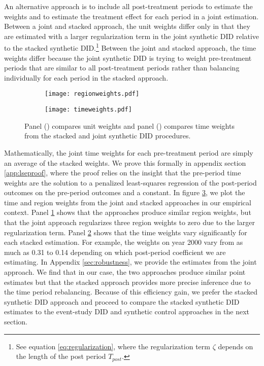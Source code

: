 \documentclass[12pt]{article}
\begin{document}
An alternative approach is to include all post-treatment periods to estimate the weights and to estimate the treatment effect for each period in a joint estimation.  Between a joint and stacked approach, the unit weights differ only in that they are estimated with a larger regularization term in the joint synthetic DID relative to the stacked synthetic DID.\footnote{See equation \ref{eq:regularization}, where the regularization term \(\zeta\) depends on the length of the post period \(T_{post}\).}  Between the joint and stacked approach, the time weights differ because the joint synthetic DID is trying to weight pre-treatment periods that are similar to all post-treatment periods rather than balancing individually for each period in the stacked approach.  

\begin{figure}
\centering
\begin{subfigure}[t]{.49\textwidth}
    \centering
    \vspace{0pt}
     \texttt{[image: regionweights.pdf]}
        \caption{}\label{fig:regionweights}
\end{subfigure}
    \begin{subfigure}[t]{.49\textwidth}
    \centering
    \vspace{0pt}
     \texttt{[image: timeweights.pdf]}
        \caption{}\label{fig:timeweights}
\end{subfigure}
    \caption{Panel () compares unit weights and panel () compares time weights from the stacked and joint synthetic DID procedures.} \label{fig:stackedjointcomparison}
\end{figure}

Mathematically, the joint time weights for each pre-treatment period are simply an average of the stacked weights.  We prove this formally in appendix section \ref{app:lseproof}, where the proof relies on the insight that the pre-period time weights are the solution to a penalized least-squares regression of the post-period outcomes on the pre-period outcomes and a constant.  In figure \ref{fig:stackedjointcomparison}, we plot the time and region weights from the joint and stacked approaches in our empirical context.  Panel \ref{fig:regionweights} shows that the approaches produce similar region weights, but that the joint approach regularizes three region weights to zero due to the larger regularization term.  Panel \ref{fig:timeweights} shows that the time weights vary significantly for each stacked estimation.  For example, the weights on year 2000 vary from as much as 0.31 to 0.14 depending on which post-period coefficient we are estimating.  In Appendix \ref{sec:robustness}, we provide the estimates from the joint approach. We find that in our case, the two approaches produce similar point estimates but that the stacked approach provides more precise inference due to the time period rebalancing.  Because of this efficiency gain, we prefer the stacked synthetic DID approach and proceed to compare the stacked synthetic DID estimates to the event-study DID and synthetic control approaches in the next section.
\end{document}

